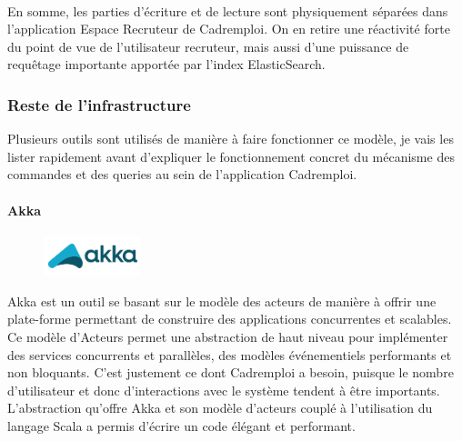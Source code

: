 \paragraph{}
En somme, les parties d'écriture et de lecture sont physiquement séparées dans l'application Espace Recruteur de Cadremploi.
On en retire une réactivité forte du point de vue de l'utilisateur recruteur, mais aussi d'une puissance de requêtage importante apportée par l'index ElasticSearch.

\subsubsection{Reste de l'infrastructure}
\label{subs:Reste de l'infrastructure}
Plusieurs outils sont utilisés de manière à faire fonctionner ce modèle, je vais les lister rapidement avant d'expliquer le fonctionnement concret du mécanisme des commandes et des queries au sein de l'application Cadremploi.
\paragraph{Akka}
\label{par:Akka}
\begin{figure}
  \begin{center}
    \includegraphics[width=0.25\textwidth]{Pictures/akka_logo.png}
  \end{center}
\end{figure}
Akka est un outil se basant sur le modèle des acteurs de manière à offrir une plate-forme permettant de construire des applications concurrentes et scalables.
Ce modèle d'Acteurs permet une abstraction de haut niveau pour implémenter des services concurrents et parallèles, des modèles événementiels performants et non bloquants.
C'est justement ce dont Cadremploi a besoin, puisque le nombre d'utilisateur et donc d'interactions avec le système tendent à être importants.
L'abstraction qu'offre Akka et son modèle d'acteurs couplé à l'utilisation du langage Scala a permis d'écrire un code élégant et performant.
